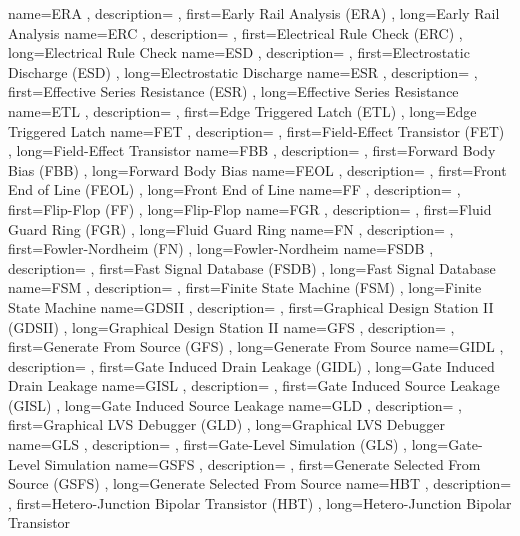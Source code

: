 { name={ERA}
, description={}
, first={Early Rail Analysis (ERA)}
, long={Early Rail Analysis}
}
{ name={ERC}
, description={}
, first={Electrical Rule Check (ERC)}
, long={Electrical Rule Check}
}
{ name={ESD}
, description={}
, first={Electrostatic Discharge (ESD)}
, long={Electrostatic Discharge}
}
{ name={ESR}
, description={}
, first={Effective Series Resistance (ESR)}
, long={Effective Series Resistance}
}
{ name={ETL}
, description={}
, first={Edge Triggered Latch (ETL)}
, long={Edge Triggered Latch}
}
{ name={FET}
, description={}
, first={Field-Effect Transistor (FET)}
, long={Field-Effect Transistor}
}
{ name={FBB}
, description={}
, first={Forward Body Bias (FBB)}
, long={Forward Body Bias}
}
{ name={FEOL}
, description={}
, first={Front End of Line (FEOL)}
, long={Front End of Line}
}
{ name={FF}
, description={}
, first={Flip-Flop (FF)}
, long={Flip-Flop}
}
{ name={FGR}
, description={}
, first={Fluid Guard Ring (FGR)}
, long={Fluid Guard Ring}
}
{ name={FN}
, description={}
, first={Fowler-Nordheim (FN)}
, long={Fowler-Nordheim}
}
{ name={FSDB}
, description={}
, first={Fast Signal Database (FSDB)}
, long={Fast Signal Database}
}
{ name={FSM}
, description={}
, first={Finite State Machine (FSM)}
, long={Finite State Machine}
}
{ name={GDSII}
, description={}
, first={Graphical Design Station II (GDSII)}
, long={Graphical Design Station II}
}
{ name={GFS}
, description={}
, first={Generate From Source (GFS)}
, long={Generate From Source}
}
{ name={GIDL}
, description={}
, first={Gate Induced Drain Leakage (GIDL)}
, long={Gate Induced Drain Leakage}
}
{ name={GISL}
, description={}
, first={Gate Induced Source Leakage (GISL)}
, long={Gate Induced Source Leakage}
}
{ name={GLD}
, description={}
, first={Graphical LVS Debugger (GLD)}
, long={Graphical LVS Debugger}
}
{ name={GLS}
, description={}
, first={Gate-Level Simulation (GLS)}
, long={Gate-Level Simulation}
}
{ name={GSFS}
, description={}
, first={Generate Selected From Source (GSFS)}
, long={Generate Selected From Source}
}
{ name={HBT}
, description={}
, first={Hetero-Junction Bipolar Transistor (HBT)}
, long={Hetero-Junction Bipolar Transistor}
}
